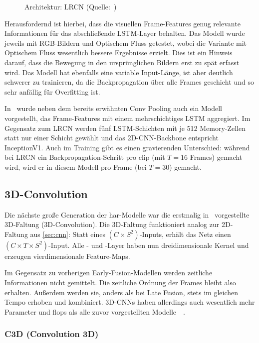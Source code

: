 \begin{figure}[h!]
    \centering
    \caption{Architektur: LRCN (Quelle:~\cite{Donahue14})}
    \label{fig:lrcn}
\end{figure}

Herausfordernd ist hierbei, dass die visuellen Frame-Features genug relevante Informationen für das abschließende LSTM-Layer behalten.
Das Modell wurde jeweils mit RGB-Bildern und Optischem Fluss getestet, wobei die Variante mit Optischem Fluss wesentlich bessere Ergebnisse erzielt.
Dies ist \ua ein Hinweis darauf, dass die Bewegung in den ursprünglichen Bildern erst zu spät erfasst wird.
Das Modell hat ebenfalls eine variable Input-Länge, ist aber deutlich schwerer zu trainieren, da die Backpropagation über alle Frames geschieht und so sehr anfällig für Overfitting ist.

In~\cite{Ng15} wurde neben dem bereits erwähnten Conv Pooling auch ein Modell vorgestellt, das Frame-Features mit einem mehrschichtiges LSTM aggregiert.
Im Gegensatz zum LRCN werden fünf LSTM-Schichten mit je 512 Memory-Zellen statt nur einer Schicht gewählt und das 2D-CNN-Backbone entspricht InceptionV1.
Auch im Training gibt es einen gravierenden Unterschied:
während bei LRCN ein Backpropagation-Schritt pro \gls{clip} (mit $T = 16$ Frames) gemacht wird, wird er in diesem Modell pro Frame (bei $T = 30$) gemacht.

\subsection{3D-Convolution}
\label{subsec:3d-conv}

Die nächste große Generation der \gls{har}-Modelle war die erstmalig in~\cite{Ji13} vorgestellte 3D-Faltung (3D-Convolution).
Die 3D-Faltung funktioniert analog zur 2D-Faltung aus \autoref{sec:cnn}:
Statt eines $(C \times S^2)$-Inputs, erhält das Netz einen $(C \times T \times S^2)$-Input.
Alle \conv- und \pool-Layer haben nun dreidimensionale Kernel und erzeugen vierdimensionale Feature-Maps.

Im Gegensatz zu vorherigen Early-Fusion-Modellen werden zeitliche Informationen nicht gemittelt.
Die zeitliche Ordnung der Frames bleibt also erhalten.
Außerdem werden sie, anders als bei Late Fusion, stets im gleichen Tempo erhoben und kombiniert.
3D-CNNs haben allerdings auch wesentlich mehr Parameter und \gls{flops} als alle zuvor vorgestellten Modelle~\cite{Zhu19}~\cite{Carreira17}.

\subsubsection*{C3D (Convolution 3D)}

